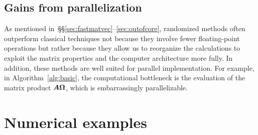 \documentclass[final]{siamltex}
\newcounter{algorithm}[section]
\begin{document}

\subsection{Gains from parallelization}
\label{sec:parallel}

As mentioned in~\S\S\ref{sec:fastmatvec}--\ref{sec:outofcore},
randomized methods often outperform classical techniques not
because they involve fewer floating-point operations but
rather because they allow us to reorganize the calculations
to exploit the matrix properties and the computer architecture more fully.
In addition, these methods are well suited for parallel implementation.
For example, in Algorithm~\ref{alg:basic}, the computational
bottleneck is the evaluation of the matrix product $\bm{A\Omega}$,
which is embarrassingly parallelizable.


\lsp

\section{Numerical examples}
\label{sec:numerics}

%
\end{document}
